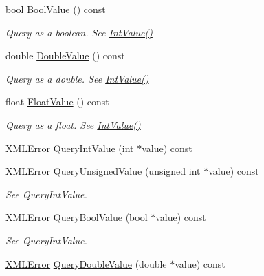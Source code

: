 \begin{DoxyCompactItemize}
bool \hyperlink{classtinyxml2_1_1_x_m_l_attribute_afb444b7a12527f836aa161b54b2f7ce7}{Bool\+Value} () const 
\begin{DoxyCompactList}\small\item\em Query as a boolean. See \hyperlink{classtinyxml2_1_1_x_m_l_attribute_a949d02a5888092cc68c1e29185301863}{Int\+Value()} \end{DoxyCompactList}\item 
double \hyperlink{classtinyxml2_1_1_x_m_l_attribute_a336153e5aa1b7ccd6502fc249bfb3fd7}{Double\+Value} () const 
\begin{DoxyCompactList}\small\item\em Query as a double. See \hyperlink{classtinyxml2_1_1_x_m_l_attribute_a949d02a5888092cc68c1e29185301863}{Int\+Value()} \end{DoxyCompactList}\item 
float \hyperlink{classtinyxml2_1_1_x_m_l_attribute_ae3d51ff98eacc1dc46efcfdaee5c84ad}{Float\+Value} () const 
\begin{DoxyCompactList}\small\item\em Query as a float. See \hyperlink{classtinyxml2_1_1_x_m_l_attribute_a949d02a5888092cc68c1e29185301863}{Int\+Value()} \end{DoxyCompactList}\item 
\hyperlink{namespacetinyxml2_a1fbf88509c3ac88c09117b1947414e08}{X\+M\+L\+Error} \hyperlink{classtinyxml2_1_1_x_m_l_attribute_ad510a83c4ff2755844bb250b125d28ff}{Query\+Int\+Value} (int $\ast$value) const 
\item 
\hyperlink{namespacetinyxml2_a1fbf88509c3ac88c09117b1947414e08}{X\+M\+L\+Error} \hyperlink{classtinyxml2_1_1_x_m_l_attribute_ac93f5981adfd62ac4ea76bfa668ee2b4}{Query\+Unsigned\+Value} (unsigned int $\ast$value) const 
\begin{DoxyCompactList}\small\item\em See Query\+Int\+Value. \end{DoxyCompactList}\item 
\hyperlink{namespacetinyxml2_a1fbf88509c3ac88c09117b1947414e08}{X\+M\+L\+Error} \hyperlink{classtinyxml2_1_1_x_m_l_attribute_a9e9b94369f182df72aaac9acd04afead}{Query\+Bool\+Value} (bool $\ast$value) const 
\begin{DoxyCompactList}\small\item\em See Query\+Int\+Value. \end{DoxyCompactList}\item 
\hyperlink{namespacetinyxml2_a1fbf88509c3ac88c09117b1947414e08}{X\+M\+L\+Error} \hyperlink{classtinyxml2_1_1_x_m_l_attribute_a0872c05edea2a7cde4bd96c1e9cb2fc4}{Query\+Double\+Value} (double $\ast$value) const 

\end{DoxyCompactItemize}
